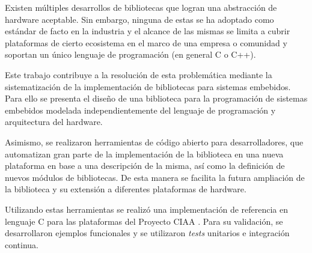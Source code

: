 Existen múltiples desarrollos de bibliotecas que logran una abstracción de hardware aceptable. Sin embargo, ninguna de estas se ha adoptado como estándar de facto en la industria y el alcance de las mismas se limita a cubrir plataformas de cierto ecosistema en el marco de una empresa o comunidad y soportan un único lenguaje de programación (en general C o C++).

Este trabajo contribuye a la resolución de esta problemática mediante la sistematización de la implementación de bibliotecas para sistemas embebidos. Para ello se presenta el diseño de una biblioteca para la programación de sistemas embebidos modelada independientemente del lenguaje de programación y arquitectura del hardware. 

Asimismo, se realizaron herramientas de código abierto para desarrolladores, que automatizan gran parte de la implementación de la biblioteca en una nueva plataforma en base a una descripción de la misma, así como la definición de nuevos módulos de bibliotecas. De esta manera se facilita la futura ampliación de la biblioteca y su extensión a diferentes plataformas de hardware.		

Utilizando estas herramientas se realizó una implementación de referencia en lenguaje C para las plataformas del Proyecto CIAA \citep{CIAA}.
Para su validación, se desarrollaron ejemplos funcionales y se utilizaron \emph{tests} unitarios e integración continua.

